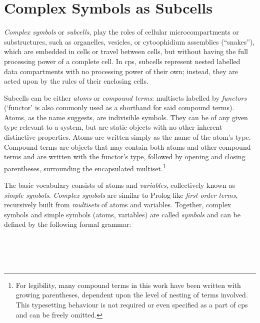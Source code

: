 \section{Complex Symbols as Subcells}

\emph{Complex symbols} or \emph{subcells}, 
play the roles of cellular microcompartments or substructures,
such as organelles, vesicles, or cytoophidium assemblies (``snakes''),
which are embedded in cells or travel between cells, 
but without having the full processing power of a complete cell.
In \gls{cps}, subcells represent nested labelled data compartments
with no processing power of their own;
instead, they are acted upon by the rules of their enclosing cells.

Subcells can be either \emph{atoms} or \emph{compound terms}: multisets labelled by \emph{functors} (`functor' is also commonly used as a shorthand for said compound terms).  Atoms, as the name suggests, are indivisible symbols.  They can be of any given type relevant to a system, but are static objects with no other inherent distinctive properties.  Atoms are written simply as the name of the atom's type.  Compound terms are objects that may contain both atoms and other compound terms and are written with the functor's type, followed by opening and closing parentheses, surrounding the encapsulated multiset.\footnote{For legibility, many compound terms in this work have been written with growing parentheses, dependent upon the level of nesting of terms involved.  This typesetting behaviour is not required or even specified as a part of \gls{cps} and can be freely omitted.}

The basic vocabulary consists of atoms and \emph{variables}, collectively known as \emph{simple symbols}.  \emph{Complex symbols} are similar to Prolog-like \emph{first-order terms}, recursively built from \emph{multisets} of atoms and variables.  Together, complex symbols and simple symbols (atoms, variables) are called \emph{symbols} and can be defined by the following formal grammar:

\begin{framed}
\vspace{-0.6cm}
\begin{small}
\begin{bnf*}
    \\
    \\
    \\
\end{bnf*}
\end{small}
\vspace{-0.8cm}
\end{framed}

